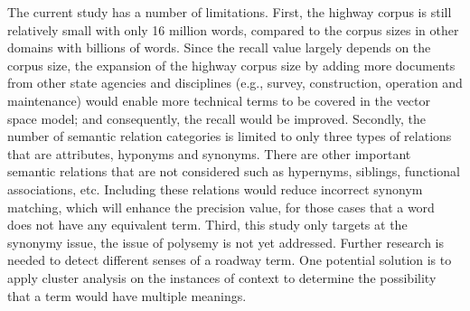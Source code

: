\documentclass[Journal, BackFigs,NoLists, DoubleSpace]{ascelike}%
\begin{document}
%
\par
%
The current study has a number of limitations. First, the highway corpus is still relatively small with only 16 million words, compared to the corpus sizes in other domains with billions of words. Since the recall value largely depends on the corpus size, the expansion of the highway corpus size by adding more documents from other state agencies and disciplines (e.g., survey, construction, operation and maintenance) would enable more technical terms to be covered in the vector space model; and consequently, the recall would be improved. Secondly, the number of semantic relation categories is limited to only three types of relations that are attributes, hyponyms and synonyms. There are other important semantic relations that are not considered such as hypernyms, siblings, functional associations, etc. Including these relations would reduce incorrect synonym matching, which will enhance the precision value, for those cases that a word does not have any equivalent term. Third, this study only targets at the synonymy issue, the issue of polysemy is not yet addressed. Further research is needed to detect different senses of a roadway term. One potential solution is to apply cluster analysis on the instances of context to determine the possibility that a term would have multiple meanings. %
%
\end{document}
